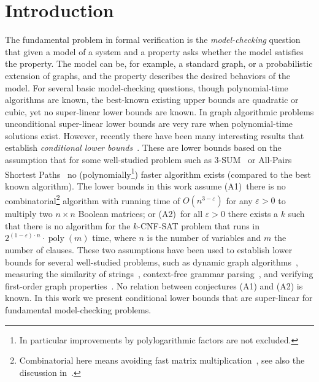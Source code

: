 \documentclass[11pt,letterpaper]{article}
\newif\iffullversion
\newcommand{\infull}[1]{\iffullversion #1\fi}
\begin{document}
\section{Introduction}
The fundamental problem in formal verification is the \emph{model-checking} 
question that given a model of a system and a property asks whether the model 
satisfies the property. 
The model can be, for example, a standard graph, or a probabilistic extension of 
graphs, and the property describes the desired behaviors\infull{ (or infinite paths)}
of the model. 
For several basic model-checking questions, though polynomial-time 
algorithms are known, the best-known existing upper bounds are quadratic or 
cubic, yet no super-linear lower bounds are known.
In graph algorithmic problems unconditional super-linear lower bounds are very 
rare when polynomial-time solutions exist.
However, recently there have been many interesting results that establish 
\emph{conditional lower bounds}~\cite{AbboudW14,AbboudWY15,AbboudBW15a}.
These are lower bounds based on the assumption that 
for some well-studied problem such as 3-SUM~\cite{GajentaanO12} or All-Pairs 
Shortest Paths~\cite{WilliamsW10,RodittyZ11} no (polynomially\footnote{In particular
improvements by polylogarithmic factors are not excluded.}) faster algorithm 
exists (compared to the best known algorithm).
The lower bounds in this work assume
(A1)~there is no combinatorial\footnote{Combinatorial here means avoiding fast matrix multiplication~\cite{LeGall14}, see also the 
discussion in~\cite{HenzingerKNS15}.} algorithm with running time of
$O(n^{3-\varepsilon})$ for any $\varepsilon > 0$
to multiply two $n \times n$ Boolean matrices;
or (A2)~for all $\varepsilon>0$ there exists a $k$ such that there is no algorithm 
for the $k$-CNF-SAT problem that runs in $2^{(1-\varepsilon) \cdot n} \cdot \operatorname{poly}(m)$ time, where $n$ is the number of variables and $m$ the number of clauses. 
These two assumptions have been used to establish lower bounds for 
several well-studied problems, such as dynamic graph algorithms~\cite{AbboudW14,AbboudWY15}, 
measuring the similarity of strings~\cite{AbboudWW14,Bringmann14,
BringmannK15,BackursI15,AbboudBW15b}, context-free grammar
parsing~\cite{Lee02,AbboudBW15a}, and verifying first-order graph 
properties~\cite{PatrascuW10,Williams14}. 
No relation between conjectures (A1) and (A2) is known. 
In this work we present conditional lower bounds that are super-linear 
for fundamental model-checking problems.
\end{document}
